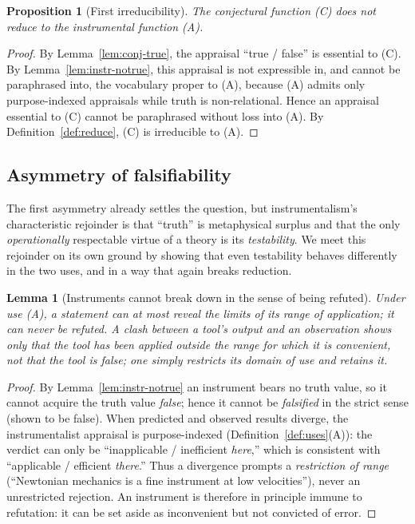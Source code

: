 \documentclass{amsart}
\theoremstyle{definition}
\theoremstyle{plain}
\newtheorem{lemma}{Lemma}
\newtheorem{proposition}{Proposition}
\begin{document}
\begin{proposition}[First irreducibility]\label{prop:irred1}
The conjectural function \textup{(C)} does not reduce to the instrumental
function \textup{(A)}.
\end{proposition}

\begin{proof}
By Lemma~\ref{lem:conj-true}, the appraisal ``true / false'' is essential to
(C). By Lemma~\ref{lem:instr-notrue}, this appraisal is not expressible in, and
cannot be paraphrased into, the vocabulary proper to (A), because (A) admits
only purpose-indexed appraisals while truth is non-relational. Hence an
appraisal essential to (C) cannot be paraphrased without loss into (A). By
Definition~\ref{def:reduce}, (C) is irreducible to (A).
\end{proof}

\subsection{Asymmetry of falsifiability}

The first asymmetry already settles the question, but instrumentalism's
characteristic rejoinder is that ``truth'' is metaphysical surplus and that
the only \emph{operationally} respectable virtue of a theory is its
\emph{testability}. We meet this rejoinder on its own ground by showing that
even testability behaves differently in the two uses, and in a way that again
breaks reduction.

\begin{lemma}[Instruments cannot break down in the sense of being
refuted]\label{lem:instr-norefute}
Under use \textup{(A)}, a statement can \emph{at most} reveal the limits of its
\emph{range of application}; it can never be \emph{refuted}. A clash between a
tool's output and an observation shows only that the tool has been applied
\emph{outside the range for which it is convenient}, not that the tool is
false; one simply restricts its domain of use and retains it.
\end{lemma}

\begin{proof}
By Lemma~\ref{lem:instr-notrue} an instrument bears no truth value, so it
cannot acquire the truth value \emph{false}; hence it cannot be
\emph{falsified} in the strict sense (shown to be false). When predicted and
observed results diverge, the instrumentalist appraisal is purpose-indexed
(Definition~\ref{def:uses}(A)): the verdict can only be ``inapplicable /
inefficient \emph{here},'' which is consistent with ``applicable / efficient
\emph{there}.'' Thus a divergence prompts a \emph{restriction of range}
(``Newtonian mechanics is a fine instrument at low velocities''), never an
unrestricted rejection. An instrument is therefore in principle immune to
refutation: it can be set aside as inconvenient but not convicted of error.
\end{proof}
\end{document}
